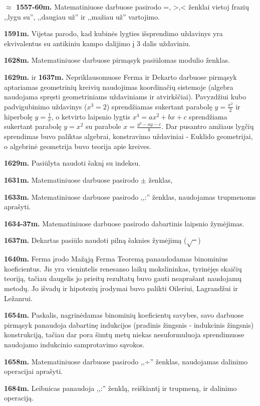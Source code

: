 \documentclass{article}
\begin{document}
\textbf{$\approx$ 1557-60m.} Matematiniuose darbuose pasirodo =, >,< ženklai vietoj frazių ,,lygu su'', ,,daugiau už'' ir ,,mažiau už'' vartojimo.

\textbf{1591m.} Vijetas parodo, kad kubinės lygties išsprendimo uždavinys yra ekvivalentus su antikiniu kampo dalijimo į 3 dalis uždaviniu. 

\textbf{1628m.} Matematiniuose darbuose pirmąsyk pasiūlomas modulio ženklas.

\textbf{1629m.} ir \textbf{1637m.} Nepriklausomuose Ferma ir Dekarto darbuose pirmąsyk aptariamas geometrinių kreivių naudojimas koordinačių sistemoje (algebra naudojama spręsti geometriniams uždaviniams ir atvirkščiai). Pavyzdžiui kubo padvigubinimo uždavinys ($x^3=2$) sprendžiamas sukertant parabolę $y=\frac{x^2}{2}$ ir hiperbolę $y=\frac{1}{x}$, o ketvirto laipsnio lygtis $x^4=ax^2+bx+c$ sprendžiama sukertant parabolę $y=x^2$ su parabole $x=\frac{y^2-ay-c}{b}$. Dar pusantro amžiaus lygčių sprendimas buvo paliktas algebrai, konstravimo uždaviniai - Euklido geometrijai, o algebrinė geometrija buvo teorija apie kreives.

\textbf{1629m.} Pasiūlyta naudoti šaknį su indeksu.

\textbf{1631m.} Matematiniuose darbuose pasirodo $\pm$ ženklas,

\textbf{1633m.} Matematiniuose darbuose pasirodo ,,:'' ženklas, naudojamas trupmenoms aprašyti.

\textbf{1634-37m.} Matematiniuose darbuose pasirodo dabartinis laipsnio žymėjimas.

\textbf{1637m.} Dekartas pasiūlo naudoti pilną šaknies žymėjimą ($\sqrt{\phantom x}$)

\textbf{1640m.} Ferma įrodo Mažąją Ferma Teoremą panaudodamas binominius koeficientus. Jis yra vienintelis renesanso laikų  mokslininkas, tyrinėjęs skaičių teoriją, tačiau daugelis jo prieitų rezultatų buvo gauti neaprašant naudojamų metodų. Jo išvadų ir hipotezių įrodymai buvo palikti Oileriui, Lagrandžui ir Ležanrui. 

\textbf{1654m.} Paskalis, nagrinėdamas binominių koeficientų savybes, savo darbuose pirmąsyk panaudoja dabartinę indukcijos (pradinis žingsnis - indukcinis žingsnis) konstrukciją, tačiau dar pora šimtų metų niekas nesuformuluoja sprendimuose naudojamo indukcinio samprotavimo sąvokos.

\textbf{1658m.} Matematiniuose darbuose pasirodo ,,÷'' ženklas, naudojamas dalinimo operacijai aprašyti.

\textbf{1684m.} Leibnicas panaudoja ,,:'' ženklą, reiškiantį ir trupmeną, ir dalinimo operaciją.
\end{document}
